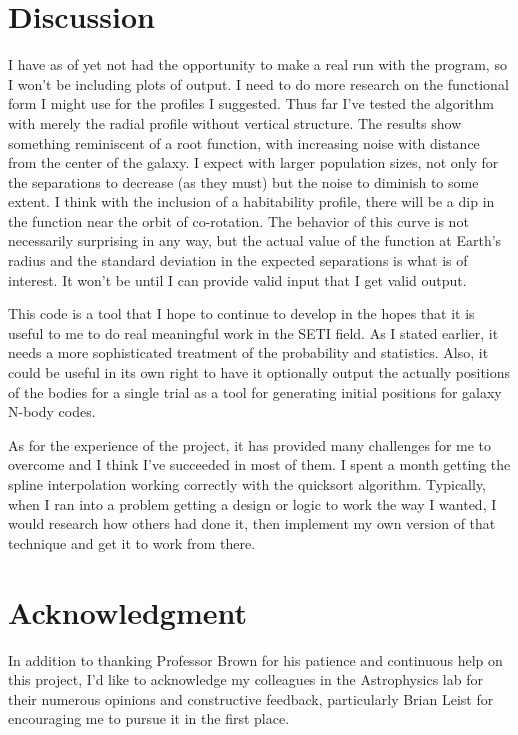 \documentclass[10pt,a4paper,final]{article}
\numberwithin{equation}{section}
\begin{document}
\begin{multicols}{2}[]
		\section{Discussion}
		
			I have as of yet not had the opportunity to make a real run with
			the program, so I won't be including plots of output.
			I need to do more research on the functional form I might use for
			the profiles I suggested. Thus far I've tested the algorithm
			with merely the radial profile without vertical structure. The
			results show something reminiscent of a root function, with increasing
			noise with distance from the center of the galaxy. I expect with
			larger population sizes, not only for the separations to decrease
			(as they must)
			but the noise to diminish to some extent. I think with the inclusion
			of a habitability profile, there will be a dip in the function near
			the orbit of co-rotation. The behavior of this curve is not
			necessarily surprising in any way, but the actual value of the function
			at Earth's radius and the standard deviation in the expected separations
			is what is of interest.
			It won't be until I can provide valid input that I get valid output.

			This code is a tool that I hope to continue to develop in the hopes
			that it is useful to me to do real meaningful work in the SETI field.
			As I stated earlier, it needs a more sophisticated treatment of the 
			probability and statistics. Also, it could be useful in its own
			right to have it optionally output the actually positions of the
			bodies for a single trial as a tool for generating initial positions
			for galaxy N-body codes.

			As for the experience of the project, it has provided many
			challenges for me to overcome and I think I've succeeded in most of them. 
			I spent a month getting the spline interpolation working correctly
			with the quicksort algorithm. Typically, when I ran into a problem
			getting a design or logic to work the way I wanted, I would research
			how others had done it, then implement my own version of that 
			technique and get it to work from there.

		\section{Acknowledgment}
			
			In addition to thanking Professor Brown for his patience and continuous
			help on this project, I'd like to acknowledge my colleagues in the
			Astrophysics lab for their 
			numerous opinions and constructive feedback, particularly Brian Leist
			for encouraging me to pursue it in the first place.


\end{multicols}
\end{document}
